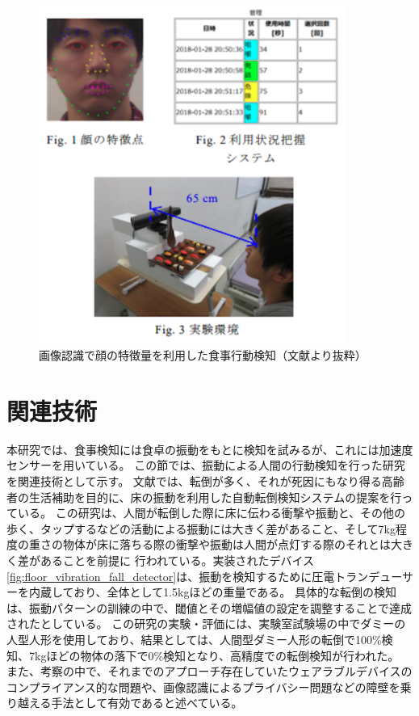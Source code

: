 \begin{figure}[htbp]
  \caption{画像認識で顔の特徴量を利用した食事行動検知（文献\cite{detect_chewing_jp}より抜粋）}
  \label{fig:detect_chewing_jp}
  \begin{center}
    \includegraphics[bb=0 0 1000 1100,width=10cm]{assets/detect_chewing_jp.png}
  \end{center}
\end{figure}

\section{関連技術}

本研究では、食事検知には食卓の振動をもとに検知を試みるが、これには加速度センサーを用いている。
この節では、振動による人間の行動検知を行った研究を関連技術として示す。
文献\cite{floor_vibration_fall_detector}では、転倒が多く、それが死因にもなり得る高齢者の生活補助を目的に、床の振動を利用した自動転倒検知システムの提案を行っている。
この研究は、人間が転倒した際に床に伝わる衝撃や振動と、その他の歩く、タップするなどの活動による振動には大きく差があること、そして7kg程度の重さの物体が床に落ちる際の衝撃や振動は人間が点灯する際のそれとは大きく差があることを前提に
行われている。実装されたデバイス\ref{fig:floor_vibration_fall_detector}は、振動を検知するために圧電トランデューサーを内蔵しており、全体として1.5kgほどの重量である。
具体的な転倒の検知は、振動パターンの訓練の中で、閾値とその増幅値の設定を調整することで達成されたとしている。
この研究の実験・評価には、実験室試験場の中でダミーの人型人形を使用しており、結果としては、人間型ダミー人形の転倒で100\%検知、7kgほどの物体の落下で0\%検知となり、高精度での転倒検知が行われた。
また、考察の中で、それまでのアプローチ存在していたウェアラブルデバイスのコンプライアンス的な問題や、画像認識によるプライバシー問題などの障壁を乗り越える手法として有効であると述べている。

